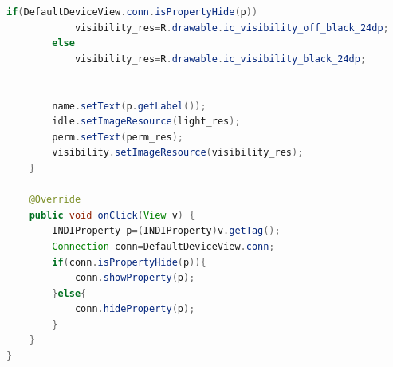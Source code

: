 \begin{lstlisting}[language=Java,caption={Clase manejadora de la propiedad connection},label={lst:connect_class}]
        if(DefaultDeviceView.conn.isPropertyHide(p))
            visibility_res=R.drawable.ic_visibility_off_black_24dp;
        else
            visibility_res=R.drawable.ic_visibility_black_24dp;


        name.setText(p.getLabel());
        idle.setImageResource(light_res);
        perm.setText(perm_res);
        visibility.setImageResource(visibility_res);
    }

    @Override
    public void onClick(View v) {
        INDIProperty p=(INDIProperty)v.getTag();
        Connection conn=DefaultDeviceView.conn;
        if(conn.isPropertyHide(p)){
            conn.showProperty(p);
        }else{
            conn.hideProperty(p);
        }
    }
}

\end{lstlisting}

